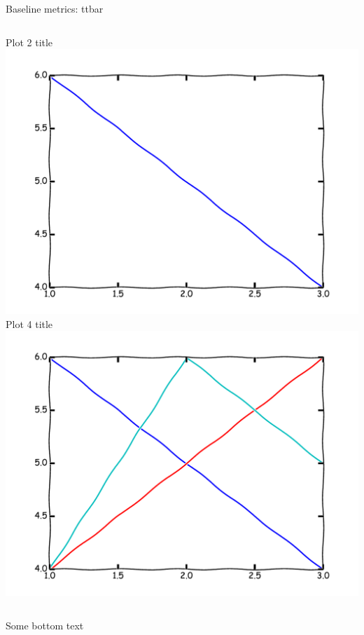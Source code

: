 \begin{frame}{Baseline metrics: ttbar}
\begin{columns}
\begin{column}{0.4\textwidth}
\begin{center}
Plot 2 title
\\
\includegraphics[width=\textwidth]{example/plot2.pdf}
\\
Plot 4 title
\\
\includegraphics[width=\textwidth]{example/plot4.pdf}
\\
\end{center}
\end{column}
\end{columns}
Some bottom text
\end{frame}
